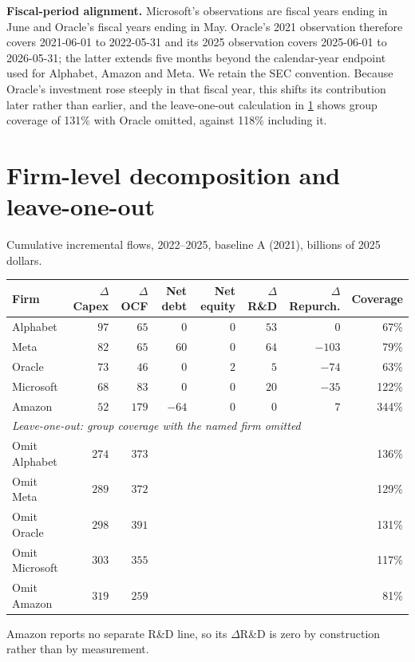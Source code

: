 \documentclass[preprint,11pt]{elsarticle}
\begin{document}
\medskip\noindent\textbf{Fiscal-period alignment.} Microsoft's observations are fiscal years ending
in June and Oracle's fiscal years ending in May. Oracle's 2021 observation therefore covers
2021-06-01 to 2022-05-31 and its 2025 observation covers 2025-06-01 to 2026-05-31; the latter
extends five months beyond the calendar-year endpoint used for Alphabet, Amazon and Meta. We retain
the SEC convention. Because Oracle's investment rose steeply in that fiscal year, this shifts its
contribution later rather than earlier, and the leave-one-out calculation in \ref{app:firm} shows group
coverage of 131\% with Oracle omitted, against 118\% including it.

\section{Firm-level decomposition and leave-one-out}\label{app:firm}
Cumulative incremental flows, 2022--2025, baseline A (2021), billions of 2025 dollars.
\begin{center}\footnotesize
\begin{tabular}{lrrrrrrr}
\toprule
Firm & $\Delta$Capex & $\Delta$OCF & Net debt & Net equity & $\Delta$R\&D & $\Delta$Repurch. & Coverage \\
\midrule
Alphabet  & $97$ & $65$  & $0$   & $0$ & $53$ & $0$    & 67\% \\
Meta      & $82$ & $65$  & $60$  & $0$ & $64$ & $-103$ & 79\% \\
Oracle    & $73$ & $46$  & $0$   & $2$ & $5$  & $-74$  & 63\% \\
Microsoft & $68$ & $83$  & $0$   & $0$ & $20$ & $-35$  & 122\% \\
Amazon    & $52$ & $179$ & $-64$ & $0$ & $0$  & $7$    & 344\% \\
\midrule
\multicolumn{8}{l}{\textit{Leave-one-out: group coverage with the named firm omitted}}\\
Omit Alphabet & $274$ & $373$ & & & & & 136\% \\
Omit Meta     & $289$ & $372$ & & & & & 129\% \\
Omit Oracle   & $298$ & $391$ & & & & & 131\% \\
Omit Microsoft& $303$ & $355$ & & & & & 117\% \\
Omit Amazon   & $319$ & $259$ & & & & & 81\% \\
\bottomrule
\end{tabular}\end{center}
\noindent Amazon reports no separate R\&D line, so its $\Delta$R\&D is zero by construction rather
than by measurement.
\end{document}

